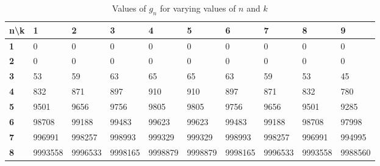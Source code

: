 \documentclass[titlepage,12pt]{article}
\begin{document}
\begin{table}[htb]
    \footnotesize
    \begin{tabular}{l|lllllllll}
        \textbf{n\textbackslash{}k} & \textbf{1}       & \textbf{2}       &  \textbf{3}       & \textbf{4}       & \textbf{5}       & \textbf{6}       & \textbf{7}       & \textbf{8}       & \textbf{9}       \\
        \hline
        \textbf{1}                  & 0       & 0       & 0       & 0       & 0       & 0       & 0       & 0       & 0       \\
        \textbf{2}                  & 0       & 0       & 0       & 0       & 0       & 0       & 0       & 0       & 0       \\
        \textbf{3}                  & 53      & 59      & 63      & 65      & 65      & 63      & 59      & 53      & 45      \\
        \textbf{4}                  & 832     & 871     & 897     & 910     & 910     & 897     & 871     & 832     & 780     \\
        \textbf{5}                  & 9501    & 9656    & 9756    & 9805    & 9805    & 9756    & 9656    & 9501    & 9285    \\
        \textbf{6}                  & 98708   & 99188   & 99483   & 99623   & 99623   & 99483   & 99188   & 98708   & 97998   \\
        \textbf{7}                  & 996991  & 998257  & 998993  & 999329  & 999329  & 998993  & 998257  & 996991  & 994995  \\
        \textbf{8}                  & 9993558 & 9996533 & 9998165 & 9998879 & 9998879 & 9998165 & 9996533 & 9993558 & 9988560
    \end{tabular}
    \caption{Values of $g_n$ for varying values of $n$ and $k$}
    \label{table:2}
\end{table}
\end{document}
